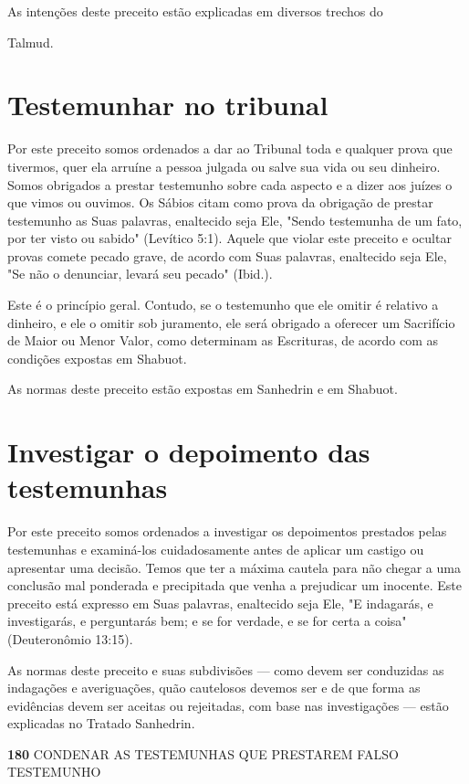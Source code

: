 \begin{itemize}
\begin{enumrate}
\begin{itemize}
\begin{itemize}
\begin{itemize}
As intenções deste preceito estão explicadas em diversos trechos do


Talmud.



\section{Testemunhar no tribunal}

Por este preceito somos ordenados a dar ao Tribunal toda e qual­quer
prova que tivermos, quer ela arruíne a pessoa julgada ou salve sua vida
ou seu dinheiro. Somos obrigados a prestar testemunho sobre cada aspecto
e a dizer aos juízes o que vimos ou ouvimos. Os Sábios citam como prova
da obrigação de prestar testemunho as Suas palavras, enaltecido seja
Ele, "Sendo testemunha de um fato, por ter visto ou sabido" (Levítico
5:1). Aquele que vio­lar este preceito e ocultar provas comete pecado
grave, de acordo com Suas palavras, enaltecido seja Ele, "Se não o
denunciar, levará seu pecado" (Ibid.).

Este é o princípio geral. Contudo, se o testemunho que ele omitir é
relativo a dinheiro, e ele o omitir sob juramento, ele será obrigado a
oferecer um Sacrifício de Maior ou Menor Valor, como determinam as
Escrituras, de acor­do com as condições expostas em Shabuot.


As normas deste preceito estão expostas em Sanhedrin e em Shabuot.


\section{Investigar o depoimento das testemunhas}

Por este preceito somos ordenados a investigar os depoimentos pres­tados
pelas testemunhas e examiná-los cuidadosamente antes de aplicar um
cas­tigo ou apresentar uma decisão. Temos que ter a máxima cautela para
não che­gar a uma conclusão mal ponderada e precipitada que venha a
prejudicar um inocente. Este preceito está expresso em Suas palavras,
enaltecido seja Ele, "E indagarás, e investigarás, e perguntarás bem; e
se for verdade, e se for certa a coisa" (Deuteronômio 13:15).

As normas deste preceito e suas subdivisões --- como devem ser
con­duzidas as indagações e averiguações, quão cautelosos devemos ser e
de que forma as evidências devem ser aceitas ou rejeitadas, com base nas
investiga­ções --- estão explicadas no Tratado Sanhedrin.

\textbf{180} CONDENAR AS TESTEMUNHAS QUE PRESTAREM FALSO TESTEMUNHO


\end{itemize}
\end{itemize}
\end{itemize}
\end{enumrate}
\end{itemize}
